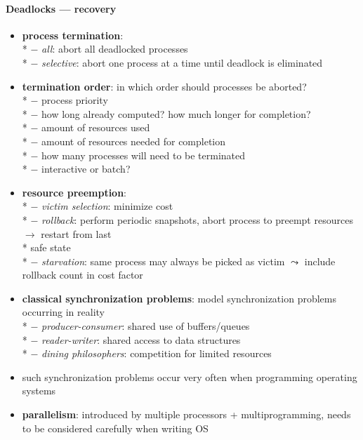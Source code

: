 \paragraph{Deadlocks --- recovery}
\begin{itemize}
  \item \textbf{process termination}: \\*
    $ - $ \emph{all}: abort all deadlocked processes \\*
    $ - $ \emph{selective}: abort one process at a time until deadlock is eliminated
  \item \textbf{termination order}: in which order should processes be aborted? \\*
    $ - $ process priority \\*
    $ - $ how long already computed? how much longer for completion? \\*
    $ - $ amount of resources used \\*
    $ - $ amount of resources needed for completion \\*
    $ - $ how many processes will need to be terminated \\*
    $ - $ interactive or batch?
  \item \textbf{resource preemption}: \\*
    $ - $ \emph{victim selection}: minimize cost \\*
    $ - $ \emph{rollback}: perform periodic snapshots, abort process to preempt resources $ \to $ restart from last \\* \phantom{$ - $} \phantom{$ \cdot $} safe state \\*
    $ - $ \emph{starvation}: same process may always be picked as victim $ \leadsto $ include rollback count in cost factor
\end{itemize}

\begin{summary}
  \begin{itemize}
    \item \textbf{classical synchronization problems}: model synchronization problems occurring in reality \\*
      $ - $ \emph{producer-consumer}: shared use of buffers/queues \\*
      $ - $ \emph{reader-writer}: shared access to data structures \\*
      $ - $ \emph{dining philosophers}: competition for limited resources
    \item such synchronization problems occur very often when programming operating systems
    \item \textbf{parallelism}: introduced by multiple processors + multiprogramming, needs to be considered carefully when writing OS
  \end{itemize}
\end{summary}